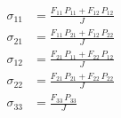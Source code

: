 \begin{align}
\sigma_{11} &= \frac{F_{11}\,P_{11}+F_{12}\,P_{12}}{J} \\ 
\sigma_{21} &= \frac{F_{11}\,P_{21}+F_{12}\,P_{22}}{J} \\ 
\sigma_{12} &= \frac{F_{21}\,P_{11}+F_{22}\,P_{12}}{J} \\ 
\sigma_{22} &= \frac{F_{21}\,P_{21}+F_{22}\,P_{22}}{J} \\ 
\sigma_{33} &= \frac{F_{33}\,P_{33}}{J} 
\end{align}
